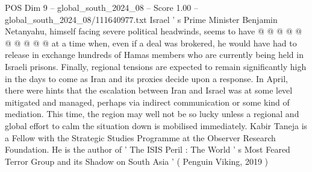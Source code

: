 \begin{textsample}{POS Dim 9 – global\_south\_2024\_08 – Score 1.00 – global\_south\_2024\_08/111640977.txt}
Israel ' s Prime Minister Benjamin Netanyahu, himself facing severe political headwinds, seems to have @ @ @ @ @ @ @ @ @ @ at a time when, even if a deal was brokered, he would have had to release in exchange hundreds of Hamas members who are currently being held in Israeli prisons.
Finally, regional tensions are expected to remain significantly high in the days to come as Iran and its proxies decide upon a response.
In April, there were hints that the escalation between Iran and Israel was at some level mitigated and managed, perhaps via indirect communication or some kind of mediation.
This time, the region may well not be so lucky unless a regional and global effort to calm the situation down is mobilised immediately.
Kabir Taneja is a Fellow with the Strategic Studies Programme at the Observer Research Foundation.
He is the author of ' The ISIS Peril : The World ' s Most Feared Terror Group and its Shadow on South Asia ' ( Penguin Viking, 2019 )

\end{textsample}
